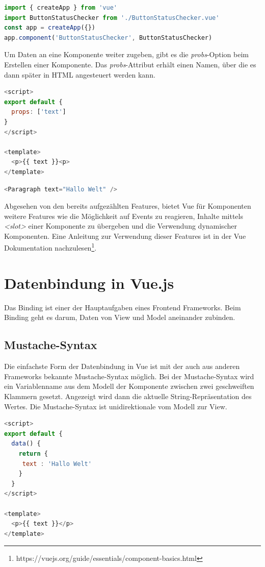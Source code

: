 
\begin{lstlisting}[caption={Globale Registrierung einer Komponente},language=javascript,label={lst:Globale Registrierung}]
import { createApp } from 'vue'
import ButtonStatusChecker from './ButtonStatusChecker.vue'
const app = createApp({})
app.component('ButtonStatusChecker', ButtonStatusChecker)
\end{lstlisting}


Um Daten an eine Komponente weiter zugeben, gibt es die \emph{probs}-Option beim Erstellen einer Komponente.
Das \emph{probs}-Attribut erhält einen Namen, über die es dann später in
HTML angesteuert werden kann. \cite{vueComponents}

\begin{lstlisting}[caption={Erstellung eines \emph{probs}},language=javascript,label={lst:Erstellung eines probs}]
<script>
export default {
  props: ['text']
}
</script>

<template>
  <p>{{ text }}<p>
</template>
\end{lstlisting}

\begin{lstlisting}[caption={Nutzung eines \emph{probs}},language=javascript,label={lst:Nutzung eines probs}]
<Paragraph text="Hallo Welt" />
\end{lstlisting}

Abgesehen von den bereits aufgezählten Features, bietet Vue für Komponenten weitere Features wie die Möglichkeit auf Events zu reagieren,
Inhalte mittels \emph{<slot>} einer Komponente zu übergeben und die Verwendung dynamischer Komponenten.
Eine Anleitung zur Verwendung dieser Features ist in der Vue Dokumentation nachzulesen\footnote{https://vuejs.org/guide/essentials/component-basics.html}.
\cite{vueComponents}


\section{Datenbindung in Vue.js}\label{sec:datenbindung-in-vue.js}
Das Binding ist einer der Hauptaufgaben eines Frontend Frameworks.
Beim Binding geht es darum, Daten von View und Model aneinander zubinden. \cite[S. 11]{steyer2019}
\subsection*{Mustache-Syntax}
Die einfachste Form der Datenbindung in Vue ist mit der auch aus anderen Frameworks bekannte Mustache-Syntax möglich.
Bei der Mustache-Syntax wird ein Variablenname aus dem Modell der Komponente zwischen zwei geschweiften Klammern gesetzt.
Angezeigt wird dann die aktuelle String-Repräsentation des Wertes.
Die Mustache-Syntax ist unidirektionale vom Modell zur View. \cite{vueTemplateSyntax}
\begin{lstlisting}[caption={Mustache-Syntax},language=javascript, label={lst:Mustache-Syntax}]
<script>
export default {
  data() {
    return {
     text : 'Hallo Welt'
    }
  }
</script>

<template>
  <p>{{ text }}</p>
</template>
\end{lstlisting}

